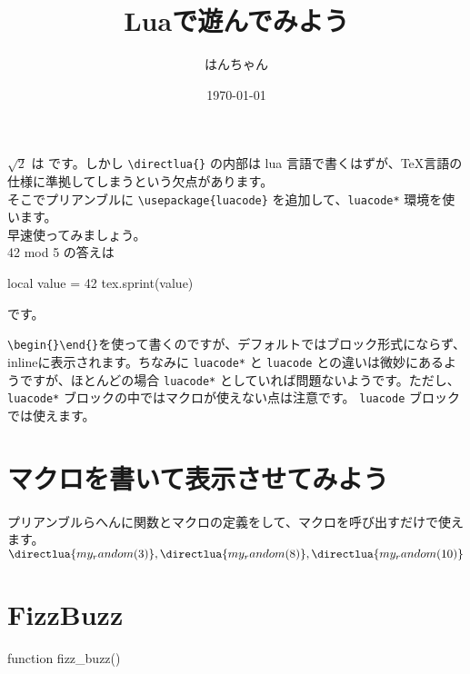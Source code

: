 \documentclass{ltjsarticle}
\title{Luaで遊んでみよう}
\author{はんちゃん}
\date{\today}
\newcommand{\myRandom}[1]{%
    \directlua{my_random(#1)}%
}
\begin{document}
\maketitle
$\sqrt{2}$ は  です。しかし \verb|\directlua{}| の内部は lua 言語で書くはずが、\TeX 言語の仕様に準拠してしまうという欠点があります。\\
そこでプリアンブルに \verb|\usepackage{luacode}| を追加して、\verb|luacode*| 環境を使います。\\
早速使ってみましょう。\\
42 mod 5 の答えは
\begin{luacode*}
    local value = 42 %
    tex.sprint(value)
\end{luacode*}
です。

\verb|\begin{}\end{}|を使って書くのですが、デフォルトではブロック形式にならず、inlineに表示されます。ちなみに \verb|luacode*| と \verb|luacode| との違いは微妙にあるようですが、ほとんどの場合 \verb|luacode*| としていれば問題ないようです。ただし、 \verb|luacode*| ブロックの中ではマクロが使えない点は注意です。
\verb|luacode| ブロックでは使えます。

\section{マクロを書いて表示させてみよう}

プリアンブルらへんに関数とマクロの定義をして、マクロを呼び出すだけで使えます。\\
$\myRandom{3}, \myRandom{8}, \myRandom{10}$

\section{FizzBuzz}
\begin{luacode*}
    function fizz_buzz()
\end{luacode*}
\end{document}
